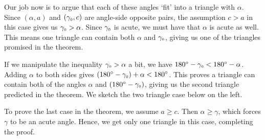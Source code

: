 \documentclass{ximera}
\begin{document}
Our job now is to  argue that each of these angles `fit' into a  triangle with $\alpha$.  Since $(\alpha, a)$ and $(\gamma_{\mbox{\tiny $0$}},c)$ are angle-side opposite pairs,  the assumption $c > a$ in this case gives us $\gamma_{\mbox{\tiny $0$}} > \alpha$. Since $\gamma_{\mbox{\tiny $0$}}$ is acute, we must have that $\alpha$ is acute as well.  This means one triangle  can contain both $\alpha$ and $\gamma_{\mbox{\tiny $0$}}$, giving us one of the triangles promised in the theorem.  

\smallskip

If we manipulate the inequality $\gamma_{\mbox{\tiny $0$}} > \alpha$ a bit, we have  $180^{\circ} - \gamma_{\mbox{\tiny $0$}} < 180^{\circ} - \alpha$.  Adding $\alpha$ to both sides gives $\left(180^{\circ} - \gamma_{\mbox{\tiny $0$}}\right) + \alpha < 180^{\circ}$. This proves a triangle can contain both of the angles $\alpha$ and $\left(180^{\circ} - \gamma_{\mbox{\tiny $0$}}\right)$, giving us the second triangle predicted in the theorem.  We sketch the two triangle case below on the left.

\smallskip

To prove the last case in the theorem, we assume $a \geq c$.  Then $\alpha \geq \gamma$, which forces $\gamma$ to be an acute angle. Hence, we get only one triangle in this case, completing the proof.
 
\end{document}
